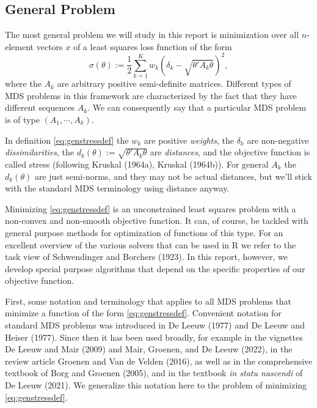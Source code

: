 \documentclass[
  12pt,
]{article}
\begin{document}
\subsection{General Problem}\label{general-problem}

The most general problem we will study in this report is minimization over all \(n\)-element vectors \(x\) of a least squares loss function of the form
\begin{equation}
\sigma(\theta):=\frac12\sum_{k=1}^K w_k(\delta_k-\sqrt{\theta'A_k\theta})^2,
\label{eq:genstressdef}
\end{equation}
where the \(A_k\) are arbitrary positive semi-definite matrices. Different types of MDS problems in this framework are characterized by the fact that they have different sequences \(A_k\). We can consequently
say that a particular MDS problem is of type \((A_1,\cdots,A_k)\).

In definition \eqref{eq:genstressdef} the \(w_k\) are positive \emph{weights},
the \(\delta_k\) are non-negative \emph{dissimilarities}, the \(d_k(\theta):=\sqrt{\theta'A_k\theta}\) are
\emph{distances}, and the objective function is called stress (following Kruskal (1964a), Kruskal (1964b)).
For general \(A_k\) the \(d_k(\theta)\) are just semi-norms, and they may not be actual distances,
but we'll stick with the standard MDS terminology using distance anyway.

Minimizing \eqref{eq:genstressdef} is an unconstrained least squares problem with a non-convex and non-smooth objective function. It can, of course, be tackled with general purpose methods for optimization of functions of this type. For an excellent overview of the various solvers that can be used in R we refer to the task view of Schwendinger and Borchers (1923). In this report, however, we develop special purpose algorithms that depend on the specific properties of our objective function.

First, some notation and terminology that applies to all MDS problems that minimize a function of the form \eqref{eq:genstressdef}. Convenient notation for standard MDS problems was introduced in De Leeuw (1977) and De Leeuw and Heiser (1977). Since then it has been used broadly, for example in the vignettes De Leeuw and Mair (2009) and Mair, Groenen, and De Leeuw (2022), in the review article Groenen and Van de Velden (2016), as well as in the comprehensive textbook of Borg and Groenen (2005), and in the textbook \emph{in statu nascendi} of De Leeuw (2021). We generalize this notation here to the problem
of minimizing \eqref{eq:genstressdef}.
\end{document}
